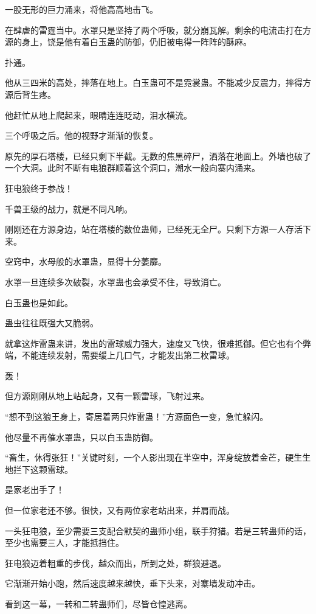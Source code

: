 \begin{this_body}
一股无形的巨力涌来，将他高高地击飞。

在肆虐的雷霆当中。水罩只是坚持了两个呼吸，就分崩瓦解。剩余的电流击打在方源的身上，饶是他有着白玉蛊的防御，仍旧被电得一阵阵的酥麻。

扑通。

他从三四米的高处，摔落在地上。白玉蛊可不是霓裳蛊。不能减少反震力，摔得方源后背生疼。

他赶忙从地上爬起来，眼睛连连眨动，泪水横流。

三个呼吸之后。他的视野才渐渐的恢复。

原先的厚石塔楼，已经只剩下半截。无数的焦黑碎尸，洒落在地面上。外墙也破了一个大洞。此时不断有电狼群顺着这个洞口，潮水一般向寨内涌来。

狂电狼终于参战！

千兽王级的战力，就是不同凡响。

刚刚还在方源身边，站在塔楼的数位蛊师，已经死无全尸。只剩下方源一人存活下来。

空窍中，水母般的水罩蛊，显得十分萎靡。

水罩一旦连续多次破裂，水罩蛊也会承受不住，导致消亡。

白玉蛊也是如此。

蛊虫往往既强大又脆弱。

就拿这炸雷蛊来讲，发出的雷球威力强大，速度又飞快，很难抵御。但它也有个弊端，不能连续发射，需要缓上几口气，才能发出第二枚雷球。

轰！

但方源刚刚从地上站起身，又有一颗雷球，飞射过来。

“想不到这狼王身上，寄居着两只炸雷蛊！”方源面色一变，急忙躲闪。

他尽量不再催水罩蛊，只以白玉蛊防御。

“畜生，休得张狂！”关键时刻，一个人影出现在半空中，浑身绽放着金芒，硬生生地拦下这颗雷球。

是家老出手了！

但一位家老还不够。很快，又有两位家老站出来，并肩而战。

一头狂电狼，至少需要三支配合默契的蛊师小组，联手狩猎。若是三转蛊师的话，至少也需要三人，才能抵挡住。

狂电狼迈着粗重的步伐，越众而出，所到之处，群狼避退。

它渐渐开始小跑，然后速度越来越快，垂下头来，对寨墙发动冲击。

看到这一幕，一转和二转蛊师们，尽皆仓惶逃离。


\end{this_body}
